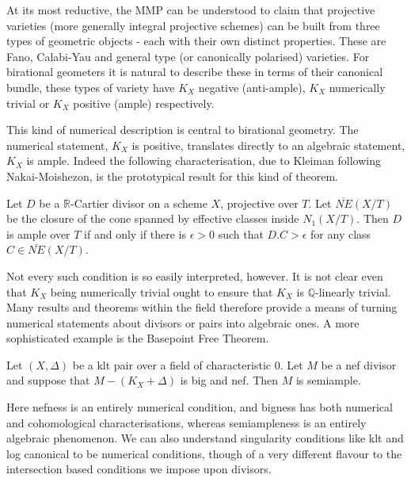 \documentclass[a4paper,12pt]{book}
\begin{document}
	At its most reductive, the MMP can be understood to claim that projective varieties (more generally integral projective schemes) can be built from three types of geometric objects - each with their own distinct properties. These are Fano, Calabi-Yau and general type (or canonically polarised) varieties. For birational geometers it is natural to describe these in terms of their canonical bundle, these types of variety have $K_{X}$ negative (anti-ample), $K_{X}$ numerically trivial or $K_{X}$ positive (ample) respectively.
	
	This kind of numerical description is central to birational geometry. The numerical statement, $K_{X}$ is positive, translates directly to an algebraic statement, $K_{X}$ is ample. Indeed the following characterisation, due to Kleiman following Nakai-Moishezon,  is the prototypical result for this kind of theorem.
	
	\begin{theorem*}\cite[Corollary 1.4.11]{La1}
		Let $D$ be a $\mathbb{R}$-Cartier divisor on a scheme $X$, projective over $T$. Let $\overline{NE}(X/T)$ be the closure of the cone spanned by effective classes inside $N_{1}(X/T)$. Then $D$ is ample over $T$ if and only if there is $\epsilon >0$ such that $D.C >\epsilon$ for any class $C \in \overline{NE}(X/T)$.
	\end{theorem*}
	
	Not every such condition is so easily interpreted, however. It is not clear even that $K_{X}$ being numerically trivial ought to ensure that $K_{X}$ is $\mathbb{Q}$-linearly trivial. Many results and theorems within the field therefore provide a means of turning numerical statements about divisors or pairs into algebraic ones. A more sophisticated example is the Basepoint Free Theorem.
	
	\begin{theorem*}\cite[Theorem 3.3]{KM}
		Let $(X,\Delta)$ be a klt pair over a field of characteristic $0$. Let $M$ be a nef divisor and suppose that $M-(K_{X}+\Delta)$ is big and nef. Then $M$ is semiample.
	\end{theorem*}
	
	Here nefness is an entirely numerical condition, and bigness has both numerical and cohomological characterisations, whereas semiampleness is an entirely algebraic phenomenon. We can also understand singularity conditions like klt and log canonical to be numerical conditions, though of a very different flavour to the intersection based conditions we impose upon divisors.
	
\end{document}
